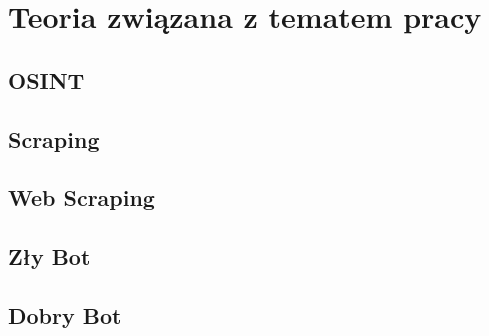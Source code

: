 \newpage

\section{Teoria związana z tematem pracy}\label{sec:teoria}

\subsection{OSINT}\label{subsec:osint}


\subsection{Scraping}\label{subsec:scraping}


\subsection{Web Scraping}\label{subsec:web-scraping}



\subsection{Zły Bot}\label{subsec:bad-bot}


\subsection{Dobry Bot}\label{subsec:good-bot}

